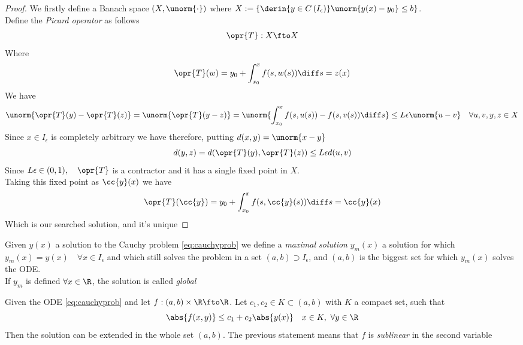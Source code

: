 \documentclass[../mmf.tex]{subfiles}
\begin{document}
\begin{proof}
	We firstly define a Banach space $(X,\unorm{\cdot})$ where $X:=\left\{ \derin{y\in C\left( I_\epsilon \right)}\unorm{y(x)-y_0}\le b \right\}$.\\
	Define the \textit{Picard operator} as follows
	\begin{equation*}
		\opr{T}:X\fto X
	\end{equation*}
	Where
	\begin{equation*}
		\opr{T}(w)=y_0+\int_{x_0}^{x}f(s,w(s))\diff s=z(x)
	\end{equation*}
	We have
	\begin{equation*}
		\unorm{\opr{T}(y)-\opr{T}(z)}=\unorm{\opr{T}(y-z)}=\unorm{\int_{x_0}^{x}f(s,u(s))-f(s,v(s))\diff s}\le L\epsilon\unorm{u-v}\quad\forall u,v,y,z\in X
	\end{equation*}
	Since $x\in I_\epsilon$ is completely arbitrary we have therefore, putting $d(x,y)=\unorm{x-y}$
	\begin{equation*}
		d(y,z)=d(\opr{T}(y),\opr{T}(z))\le L\epsilon d(u,v)
	\end{equation*}
	Since $L\epsilon\in(0,1),\quad\opr{T}$ is a contractor and it has a single fixed point in $X$.\\
	Taking this fixed point as $\cc{y}(x)$ we have
	\begin{equation*}
		\opr{T}(\cc{y})=y_0+\int_{x_0}^{x}f(s,\cc{y}(s))\diff s=\cc{y}(x)
	\end{equation*}
	Which is our searched solution, and it's unique
\end{proof}
\begin{dfn}
	Given $y(x)$ a solution to the Cauchy problem \eqref{eq:cauchyprob} we define a \textit{maximal solution} $y_m(x)$ a solution for which $y_m(x)=y(x)\quad\forall x\in I_\epsilon$ and which still solves the problem in a set $(a,b)\supset I_\epsilon$, and $(a,b)$ is the biggest set for which $y_m(x)$ solves the ODE.\\
	If $y_m$ is defined $\forall x\in\R$, the solution is called \textit{global}
\end{dfn}
\begin{thm}
	Given the ODE \eqref{eq:cauchyprob} and let $f:(a,b)\times\R\fto\R$. Let $c_1,c_2\in K\subset(a,b)$ with $K$ a compact set, such that
	\begin{equation*}
		\abs{f(x,y)}\le c_1+c_2\abs{y(x)}\quad x\in K,\ \forall y\in\R
	\end{equation*}
	Then the solution can be extended in the whole set $(a,b)$. The previous statement means that $f$ is \textit{sublinear} in the second variable
\end{thm}
\end{document}
